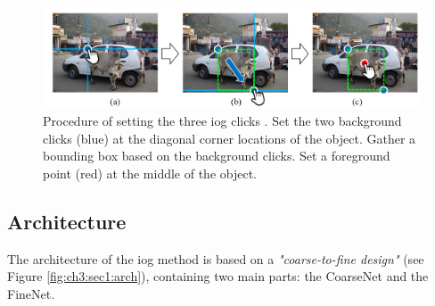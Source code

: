 \begin{figure}
	\includegraphics[width=\linewidth]{figures/chap31_clicks.png}
	\caption[IOG Application]{Procedure of setting the three \gls{iog} clicks \cite{Zha20-IOG}. Set the two background clicks (blue) at the diagonal corner locations of the object. Gather a bounding box based on the background clicks. Set a foreground point (red) at the middle of the object.}
	\label{fig:ch3:sec1:iog}
\end{figure}

\subsection{Architecture}\label{ord:ch3:sec1:subsec2}

The architecture of the \gls{iog} method is based on a \emph{"coarse-to-fine design"}\cite[p. 12237]{Zha20-IOG} (see Figure \ref{fig:ch3:sec1:arch}), containing two main parts: the CoarseNet and the FineNet.

